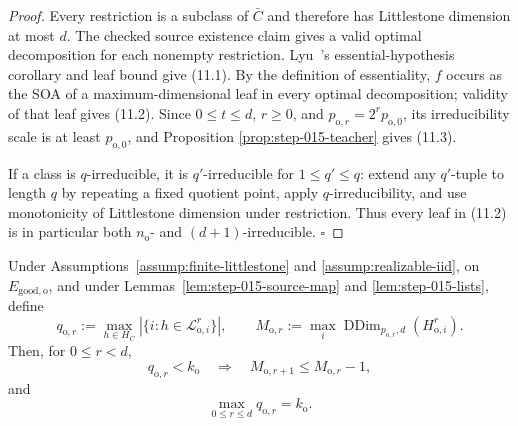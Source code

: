 \begin{proof}
Every restriction is a subclass of \(\bar C\) and therefore has
Littlestone dimension at most \(d\). The checked source existence claim
gives a valid optimal decomposition for each nonempty restriction.
Lyu~\citep{lyu2025}'s essential-hypothesis corollary and leaf bound give (11.1). By the
definition of essentiality, \(f\) occurs as the SOA of a
maximum-dimensional leaf in every optimal decomposition; validity of that
leaf gives (11.2). Since \(0\le t\le d\), \(r\ge0\), and
\(p_{\mathrm o,r}=2^rp_{\mathrm o,0}\), its irreducibility scale is at
least \(p_{\mathrm o,0}\), and Proposition
\ref{prop:step-015-teacher} gives (11.3).

If a class is \(q\)-irreducible, it is \(q'\)-irreducible for
\(1\le q'\le q\): extend any \(q'\)-tuple to length \(q\) by repeating a
fixed quotient point, apply \(q\)-irreducibility, and use monotonicity of
Littlestone dimension under restriction. Thus every leaf in (11.2) is in
particular both \(n_{\mathrm o}\)- and \((d+1)\)-irreducible. \(\square\)


\end{proof}

\begin{proposition}\label{prop:step-015-descent}
Under Assumptions~\ref{assump:finite-littlestone} and
\ref{assump:realizable-iid}, on \(E_{\mathrm{good,o}}\), and under
Lemmas~\ref{lem:step-015-source-map} and
\ref{lem:step-015-lists}, define
\[
q_{\mathrm o,r}:=
\max_{h\in H_C}|\{i:h\in\mathcal L_{\mathrm o,i}^r\}|,
\qquad
M_{\mathrm o,r}:=
\max_i\operatorname{DDim}_{p_{\mathrm o,r},d}
(H_{\mathrm o,i}^r).
\tag{12.1}
\]
Then, for \(0\le r<d\),
\[
q_{\mathrm o,r}<k_{\mathrm o}
\quad\Longrightarrow\quad
M_{\mathrm o,r+1}\le M_{\mathrm o,r}-1,
\tag{12.2}
\]
and
\[
\max_{0\le r\le d}q_{\mathrm o,r}=k_{\mathrm o}.
\tag{12.3}
\]


\end{proposition}

